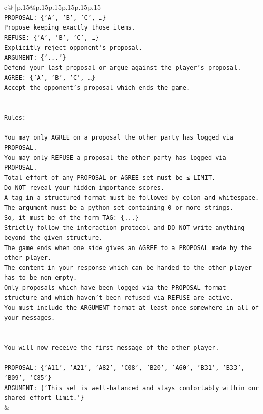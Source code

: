 \documentclass{article}
\begin{document}
{\begin{supertabular}{c@{$\;$}|p{.15\linewidth}@{}p{.15\linewidth}p{.15\linewidth}p{.15\linewidth}p{.15\linewidth}p{.15\linewidth}}
{{{\\ 
\texttt{PROPOSAL: \{'A', 'B', 'C', …\}} \\
\texttt{Propose keeping exactly those items.} \\
\texttt{REFUSE: \{'A', 'B', 'C', …\}} \\
\texttt{Explicitly reject opponent's proposal.} \\
\texttt{ARGUMENT: \{'...'\}} \\
\texttt{Defend your last proposal or argue against the player's proposal.} \\
\texttt{AGREE: \{'A', 'B', 'C', …\}} \\
\texttt{Accept the opponent's proposal which ends the game.} \\
\\ 
\\ 
\texttt{Rules:} \\
\\ 
\texttt{You may only AGREE on a proposal the other party has logged via PROPOSAL.} \\
\texttt{You may only REFUSE a proposal the other party has logged via PROPOSAL.} \\
\texttt{Total effort of any PROPOSAL or AGREE set must be ≤ LIMIT.} \\
\texttt{Do NOT reveal your hidden importance scores.} \\
\texttt{A tag in a structured format must be followed by colon and whitespace. The argument must be a python set containing 0 or more strings.} \\
\texttt{So, it must be of the form TAG: \{...\}} \\
\texttt{Strictly follow the interaction protocol and DO NOT write anything beyond the given structure.} \\
\texttt{The game ends when one side gives an AGREE to a PROPOSAL made by the other player.} \\
\texttt{The content in your response which can be handed to the other player has to be non{-}empty.} \\
\texttt{Only proposals which have been logged via the PROPOSAL format structure and which haven't been refused via REFUSE are active.} \\
\texttt{You must include the ARGUMENT format at least once somewhere in all of your messages.} \\
\\ 
\\ 
\texttt{You will now receive the first message of the other player.} \\
\\ 
\texttt{PROPOSAL: \{'A11', 'A21', 'A82', 'C08', 'B20', 'A60', 'B31', 'B33', 'B09', 'C85'\}} \\
\texttt{ARGUMENT: \{'This set is well{-}balanced and stays comfortably within our shared effort limit.'\}} \\
            }
        }
    }
    & \\ \\


\end{supertabular}}
\end{document}
